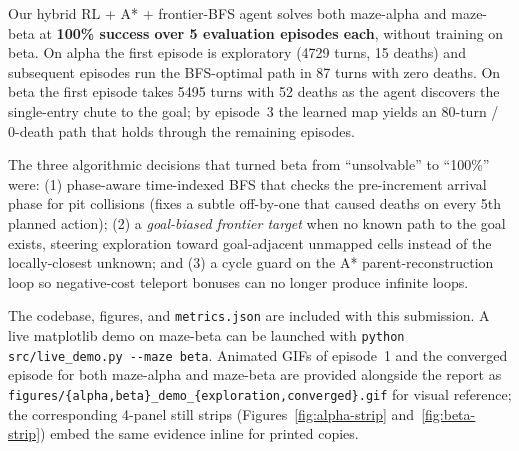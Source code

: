 \documentclass[11pt]{article}
\begin{document}
Our hybrid RL + A* + frontier-BFS agent solves both maze-alpha and
maze-beta at \textbf{100\% success over 5 evaluation episodes each},
without training on beta.  On alpha the first episode is exploratory
(4729 turns, 15 deaths) and subsequent episodes run the BFS-optimal
path in 87 turns with zero deaths.  On beta the first episode takes
5495 turns with 52 deaths as the agent discovers the single-entry
chute to the goal; by episode~3 the learned map yields an 80-turn /
0-death path that holds through the remaining episodes.

The three algorithmic decisions that turned beta from ``unsolvable'' to
``100\%'' were: (1) phase-aware time-indexed BFS that checks the
pre-increment arrival phase for pit collisions (fixes a subtle
off-by-one that caused deaths on every 5th planned action);
(2) a \emph{goal-biased frontier target} when no known path to the
goal exists, steering exploration toward goal-adjacent unmapped
cells instead of the locally-closest unknown; and (3) a cycle guard
on the A* parent-reconstruction loop so negative-cost teleport
bonuses can no longer produce infinite loops.

The codebase, figures, and \texttt{metrics.json} are included with
this submission.  A live matplotlib demo on maze-beta can be launched
with \verb|python src/live_demo.py --maze beta|.  Animated GIFs of
episode~1 and the converged episode for both maze-alpha and maze-beta
are provided alongside the report as
\texttt{figures/\{alpha,beta\}\_demo\_\{exploration,converged\}.gif}
for visual reference; the corresponding 4-panel still strips
(Figures~\ref{fig:alpha-strip} and~\ref{fig:beta-strip}) embed the
same evidence inline for printed copies.
\end{document}
